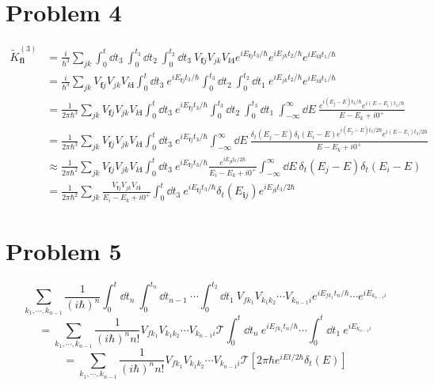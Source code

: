 \documentclass[12pt]{article}
\newcommand{\fullint}{\int_{-\infty}^\infty}
\newcommand{\fullintd}[1]{\fullint\dd#1\:}
\newcommand{\cint}[2]{\int_{#1}^{#2}}
\newcommand{\cintd}[3]{\cint{#1}{#2}\dd#3\:}
\begin{document}
\section*{Problem 4}
\begin{align*}
    \tilde{K}_\textbf{fi}^{(3)} &= \frac{i}{\hbar^3}\sum_{jk}\cintd{0}{t}{t_3}\cintd{0}{t_3}{t_2}\cintd{0}{t_2}{t_3}V_{\textbf{f}j}V_{jk}V_{k\textbf{i}}e^{iE_{\textbf{f}j}t_3/\hbar}e^{iE_{jk}t_2/\hbar}e^{iE_{k\textbf{i}}t_1/\hbar} \\
    &= \frac{i}{\hbar^3}\sum_{jk}V_{\textbf{f}j}V_{jk}V_{k\textbf{i}}\cintd{0}{t}{t_3}e^{iE_{\textbf{f}j}t_3/\hbar}\cintd{0}{t_3}{t_2}\cintd{0}{t_2}{t_1}e^{iE_{jk}t_2/\hbar}e^{iE_{k\textbf{i}}t_1/\hbar} \\
    &= \frac{1}{2\pi\hbar^3}\sum_{jk}V_{\textbf{f}j}V_{jk}V_{k\textbf{i}}\cintd{0}{t}{t_3}e^{iE_{\textbf{f}j}t_3/\hbar}\cintd{0}{t_3}{t_2}\cintd{0}{t_3}{t_1}\fullintd{E}\frac{e^{i(E_j - E)t_2/\hbar}e^{i(E-E_i)t_1/\hbar}}{E - E_k + i0^+} \\
    &= \frac{1}{2\pi\hbar^3}\sum_{jk}V_{\textbf{f}j}V_{jk}V_{k\textbf{i}}\cintd{0}{t}{t_3}e^{iE_{\textbf{f}j}t_3/\hbar}\fullintd{E}\frac{\delta_t(E_j-E)\delta_t(E_i-E)e^{i(E_j-E)t_3/2\hbar}e^{i(E-E_i)t_3/2\hbar}}{E-E_k+i0^+} \\
    &\approx \frac{1}{2\pi\hbar^2}\sum_{jk}V_{\textbf{f}j}V_{jk}V_{k\textbf{i}}\cintd{0}{t}{t_3}e^{iE_{\textbf{f}j}t_3/\hbar}\frac{e^{iE_{j\textbf{i}}t_3/2\hbar}}{E_i - E_k + i0^+}\fullintd{E}\delta_t(E_j-E)\delta_t(E_i-E) \\
    &= \frac{1}{2\pi\hbar^2}\sum_{jk}\frac{V_{\textbf{f}j}V_{jk}V_{k\textbf{i}}}{E_i-E_k+i0^+}\cintd{0}{t}{t_3}e^{iE_{\textbf{f}j}t_3/\hbar}\delta_t(E_{\textbf{i}j})e^{iE_{j\textbf{i}}t_3/2\hbar}
\end{align*}

\section*{Problem 5}
\[ \sum_{k_1,\cdots,k_{n-1}} \frac{1}{(i\hbar)^n} \cintd{0}{t}{t_n}\cintd{0}{t_n}{t_{n-1}}\cdots\cintd{0}{t_2}{t_1} V_{fk_1}V_{k_1k_2}\cdots V_{k_{n-1}i} e^{iE_{fk_1}t_n/\hbar}\cdots e^{iE_{k_{n-1}i}} \]
\[ = \sum_{k_1,\cdots,k_{n-1}} \frac{1}{(i\hbar)^n n!} V_{fk_1}V_{k_1k_2}\cdots V_{k_{n-1}i} \mathscr{T} \cintd{0}{t}{t_n}e^{iE_{fk_1}t_n/\hbar} \cdots   \cintd{0}{t}{t_1}e^{iE_{k_{n-1}i}} \]
\[ = \sum_{k_1,\cdots,k_{n-1}} \frac{1}{(i\hbar)^n n!} V_{fk_1}V_{k_1k_2}\cdots V_{k_{n-1}i} \mathscr{T} \left[2\pi\hbar e^{iEt/2\hbar} \delta_t(E)\right] \]
\end{document}
